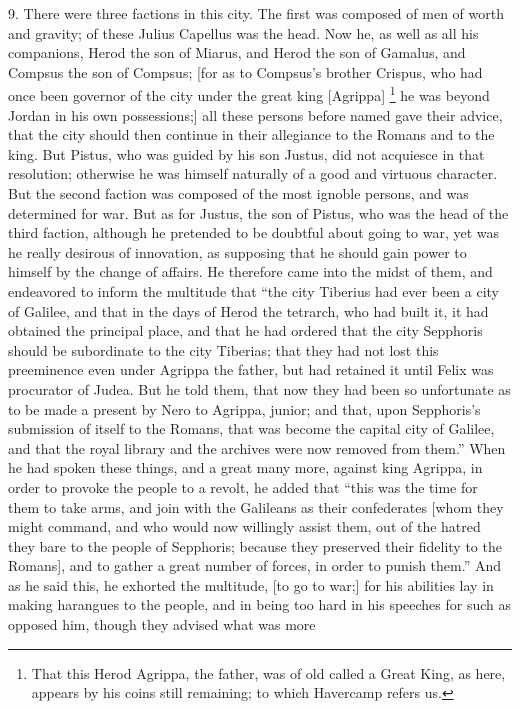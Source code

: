 9. There were three factions in this city. The first was composed of men
of worth and gravity; of these Julius Capellus was the head. Now he, as
well as all his companions, Herod the son of Miarus, and Herod the son of
Gamalus, and Compsus the son of Compsus; [for as to Compsus's brother
Crispus, who had once been governor of the city under the great king
[Agrippa] \footnote{That this Herod Agrippa,
the father, was of old called a Great King, as here, appears by his coins
still remaining; to which Havercamp refers us.}
he was beyond Jordan in his own possessions;] all these persons before
named gave their advice, that the city should then continue in their
allegiance to the Romans and to the king. But Pistus, who was guided by
his son Justus, did not acquiesce in that resolution; otherwise he was
himself naturally of a good and virtuous character. But the second faction
was composed of the most ignoble persons, and was determined for war. But
as for Justus, the son of Pistus, who was the head of the third faction,
although he pretended to be doubtful about going to war, yet was he really
desirous of innovation, as supposing that he should gain power to himself
by the change of affairs. He therefore came into the midst of them, and
endeavored to inform the multitude that ``the city Tiberius had ever been a
city of Galilee, and that in the days of Herod the tetrarch, who had built
it, it had obtained the principal place, and that he had ordered that the
city Sepphoris should be subordinate to the city Tiberias; that they had
not lost this preeminence even under Agrippa the father, but had retained
it until Felix was procurator of Judea. But he told them, that now they
had been so unfortunate as to be made a present by Nero to Agrippa,
junior; and that, upon Sepphoris's submission of itself to the Romans,
that was become the capital city of Galilee, and that the royal library
and the archives were now removed from them.'' When he had spoken these
things, and a great many more, against king Agrippa, in order to provoke
the people to a revolt, he added that ``this was the time for them to take
arms, and join with the Galileans as their confederates [whom they might
command, and who would now willingly assist them, out of the hatred they
bare to the people of Sepphoris; because they preserved their fidelity to
the Romans], and to gather a great number of forces, in order to punish
them.'' And as he said this, he exhorted the multitude, [to go to war;] for
his abilities lay in making harangues to the people, and in being too hard
in his speeches for such as opposed him, though they advised what was more
